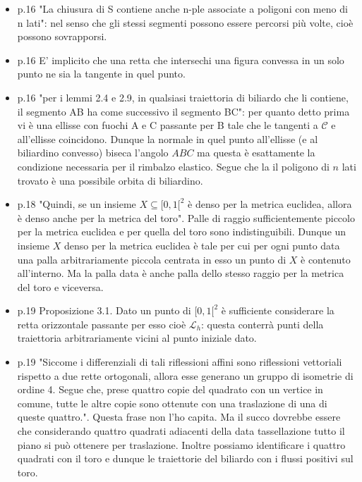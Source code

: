 \documentclass[10pt,a4paper]{article}
\begin{document}
\begin{itemize}
\item p.16 "La chiusura di S contiene anche n-ple associate a poligoni con meno di n
lati": nel senso che gli stessi segmenti possono essere percorsi più volte, cioè possono sovrapporsi.

\item p.16 E' implicito che una retta che intersechi una figura convessa in un solo punto ne sia la tangente in quel punto.

\item p.16 "per i lemmi 2.4 e 2.9, in qualsiasi traiettoria di biliardo che li
contiene, il segmento AB ha come successivo il segmento BC": per quanto detto prima vi è una ellisse con fuochi A e C passante per B tale che le tangenti a $\mathcal{C}$ e all'ellisse coincidono. Dunque la normale in quel punto all'ellisse (e al biliardino convesso) biseca l'angolo $ABC$ ma questa è esattamente la condizione necessaria per il rimbalzo elastico. Segue che la il poligono di $n$ lati trovato è una possibile orbita di biliardino.

\item p.18 "Quindi, se un insieme $X \subseteq [0, 1[^{2}$ è denso per la metrica euclidea, allora è denso anche per
la metrica del toro". Palle di raggio sufficientemente piccolo per la metrica euclidea e per quella del toro sono indistinguibili. Dunque un insieme $X$ denso per la metrica euclidea è tale per cui per ogni punto data una palla arbitrariamente piccola centrata in esso un punto di $X$ è contenuto all'interno. Ma la palla data è anche palla dello stesso raggio per la metrica del toro e viceversa.

\item p.19 Proposizione 3.1. Dato un punto di $[0, 1[^{2}$ è sufficiente considerare la retta orizzontale passante per esso cioè $\mathcal{L}_{h}$: questa conterrà punti della traiettoria arbitrariamente vicini al punto iniziale dato.

\item p.19 "Siccome i differenziali di tali riflessioni affini sono riflessioni vettoriali rispetto a due rette
ortogonali, allora esse generano un gruppo di isometrie di ordine 4. Segue che, prese quattro copie
del quadrato con un vertice in comune, tutte le altre copie sono ottenute con una traslazione di
una di queste quattro.". Questa frase non l'ho capita. Ma il succo dovrebbe essere che considerando quattro quadrati adiacenti della data tassellazione tutto il piano si può ottenere per traslazione. Inoltre possiamo identificare i quattro quadrati con il toro e dunque le traiettorie del biliardo con i flussi positivi sul toro.


\end{itemize}
\end{document}

